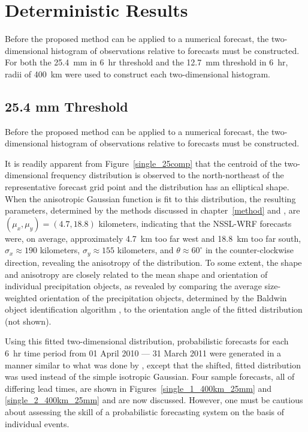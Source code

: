 

\section{Deterministic Results}
\label{dresults}

Before the proposed method can be applied to a numerical forecast, the two-dimensional histogram of observations relative to forecasts must be constructed.
For both the \mbox{25.4 mm} in \mbox{6 hr} threshold and the \mbox{12.7 mm} threshold in \mbox{6 hr}, radii of \mbox{400 km} were used to construct each two-dimensional histogram.



\subsection{25.4 mm Threshold}
\label{dresults_25.4mm}

Before the proposed method can be applied to a numerical forecast, the two-dimensional histogram of observations relative to forecasts must be constructed.

It is readily apparent from \mbox{Figure \ref{single_25comp}} that the centroid of the two-dimensional frequency distribution is observed to the north-northeast of the representative forecast grid point and the distribution has an elliptical shape.
When the anisotropic Gaussian function is fit to this distribution, the resulting parameters, determined by the methods discussed in \mbox{chapter \ref{method}} and \cite{Lak2010}, are $(\mu_x, \mu_y) = (4.7, 18.8)$ kilometers, indicating that the NSSL-WRF forecasts were, on average, approximately \mbox{4.7 km} too far west and \mbox{18.8 km} too far south, $\sigma_x \approx 190$ kilometers, $\sigma_y \approx 155$ kilometers, and $\theta \approx 60^{\circ}$ in the counter-clockwise direction, revealing the anisotropy of the distribution.
To some extent, the shape and anisotropy are closely related to the mean shape and orientation of individual precipitation objects, as revealed by comparing the average size-weighted orientation of the precipitation objects, determined by the Baldwin object identification algorithm \citep{Baldwin2005}, to the orientation angle of the fitted distribution (not shown).


Using this fitted two-dimensional distribution, probabilistic forecasts for each \mbox{6 hr} time period from 01 April 2010 --- 31 March 2011 were generated in a manner similar to what was done by \cite{Sobash2011}, except that the shifted, fitted distribution was used instead of the simple isotropic Gaussian.
Four sample forecasts, all of differing lead times, are shown in \mbox{Figures \ref{single_1_400km_25mm}} and \ref{single_2_400km_25mm} and are now discussed.
However, one must be cautious about assessing the skill of a probabilistic forecasting system on the basis of individual events.


